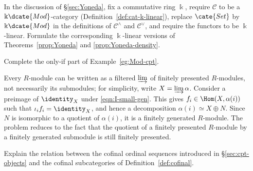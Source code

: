 \begin{Exercises}
	\item In the discussion of \S\ref{sec:Yoneda}, fix a commutative ring $\Bbbk$, require $\mathcal{C}$ to be a $\Bbbk\dcate{Mod}$-category (Definition~\ref{def:cat-k-linear}), replace $\cate{Set}$ by $\Bbbk\dcate{Mod}$ in the definitions of $\mathcal{C}^\wedge$ and $\mathcal{C}^\vee$, and require the functors to be $\Bbbk$-linear. Formulate the corresponding $\Bbbk$-linear versions of Theorems~\ref{prop:Yoneda} and \ref{prop:Yoneda-density}.

	\item Complete the only-if part of Example~\ref{eg:Mod-cpt}.
	\begin{hint}
		Every $R$-module can be written as a filtered $\varinjlim$ of finitely presented $R$-modules, not necessarily its submodules; for simplicity, write $X=\varinjlim\alpha$. Consider a preimage of $\identity_X$ under \eqref{eqn:I-small-gen}. This gives
		$f_i\in\Hom(X,\alpha(i))$ such that $\iota_i f_i=\identity_X$, and hence a decomposition $\alpha(i)\simeq X\oplus N$. Since $N$ is isomorphic to a quotient of $\alpha(i)$, it is a finitely generated $R$-module. The problem reduces to the fact that the quotient of a finitely presented $R$-module by a finitely generated submodule is still finitely presented.
	\end{hint}

	\item Explain the relation between the cofinal ordinal sequences introduced in \S\ref{sec:cpt-objects} and the cofinal subcategories of Definition~\ref{def:cofinal}.


\end{Exercises}
